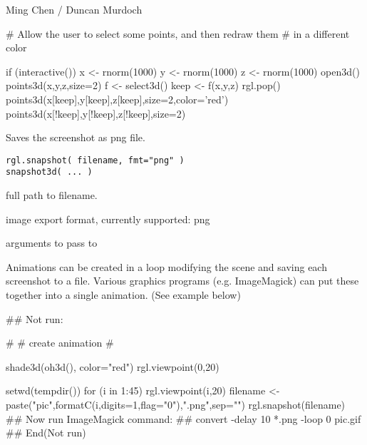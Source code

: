 \documentclass{article}
\begin{document}
\begin{Author}\relax
Ming Chen / Duncan Murdoch
\end{Author}
\begin{SeeAlso}\relax
{}
\end{SeeAlso}
\begin{Examples}
\begin{ExampleCode}

# Allow the user to select some points, and then redraw them
# in a different color

if (interactive()) {
 x <- rnorm(1000)
 y <- rnorm(1000)
 z <- rnorm(1000)
 open3d()
 points3d(x,y,z,size=2)
 f <- select3d()
 keep <- f(x,y,z)
 rgl.pop()
 points3d(x[keep],y[keep],z[keep],size=2,color='red')
 points3d(x[!keep],y[!keep],z[!keep],size=2)
}
\end{ExampleCode}
\end{Examples}

\begin{Description}\relax
Saves the screenshot as png file.
\end{Description}
\begin{Usage}
\begin{verbatim}
rgl.snapshot( filename, fmt="png" )
snapshot3d( ... )
\end{verbatim}
\end{Usage}
\begin{Arguments}
\begin{ldescription}
\item[\code{filename}] full path to filename.
\item[\code{fmt}] image export format, currently supported: png 
\item[\code{...}] arguments to pass to  
\end{ldescription}
\end{Arguments}
\begin{Details}\relax
Animations can be created in a loop modifying the scene and saving 
each screenshot to a file. Various graphics programs (e.g. ImageMagick)
can put these together into a single animation. (See example below)
\end{Details}
\begin{SeeAlso}\relax
{}
\end{SeeAlso}
\begin{Examples}
\begin{ExampleCode}

## Not run: 

#
# create animation
#

shade3d(oh3d(), color="red")
rgl.viewpoint(0,20)

setwd(tempdir())
for (i in 1:45) {
  rgl.viewpoint(i,20)
  filename <- paste("pic",formatC(i,digits=1,flag="0"),".png",sep="")
  rgl.snapshot(filename)
}
## Now run ImageMagick command:
##    convert -delay 10 *.png -loop 0 pic.gif
## End(Not run)

\end{ExampleCode}
\end{Examples}
\end{document}
